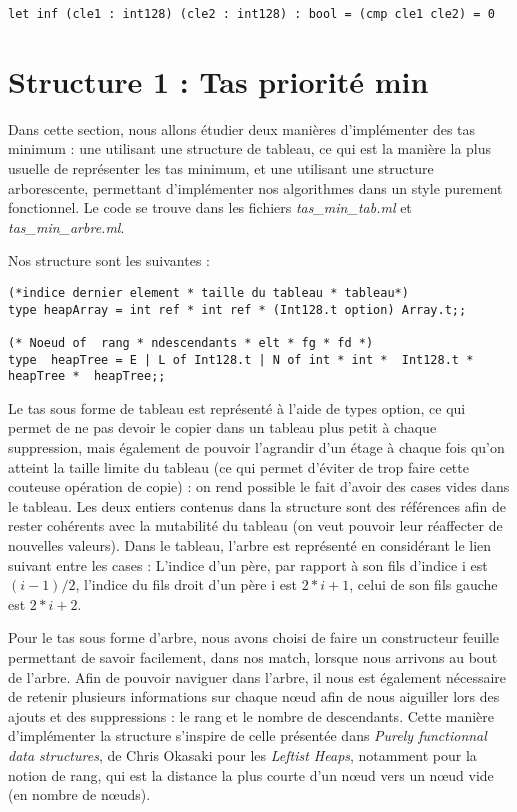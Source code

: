 \documentclass[12pt,a4paper]{article}
\begin{document}
\medskip \begin{lstlisting}
let inf (cle1 : int128) (cle2 : int128) : bool = (cmp cle1 cle2) = 0
\end{lstlisting} \medskip



 \section{Structure 1 : Tas priorité min}

Dans cette section, nous allons étudier deux manières d'implémenter des tas minimum : une utilisant une structure de tableau, ce qui est la manière la plus usuelle de représenter les tas minimum, et une utilisant une structure arborescente, permettant d'implémenter nos algorithmes dans un style purement fonctionnel.
Le code se trouve dans les fichiers \textit{tas\_min\_tab.ml} et \textit{tas\_min\_arbre.ml}. 

Nos structure sont les suivantes : 

\bigskip \begin{lstlisting}
(*indice dernier element * taille du tableau * tableau*)
type heapArray = int ref * int ref * (Int128.t option) Array.t;;

(* Noeud of  rang * ndescendants * elt * fg * fd *)
type  heapTree = E | L of Int128.t | N of int * int *  Int128.t *  heapTree *  heapTree;;
\end{lstlisting} \bigskip

Le tas sous forme de tableau est représenté à l'aide de types option, ce qui permet de ne pas devoir le copier dans un tableau plus petit à chaque suppression, mais également de pouvoir l'agrandir d'un étage à chaque fois qu'on atteint la taille limite du tableau (ce qui permet d'éviter de trop faire cette couteuse opération de copie) : on rend possible le fait d'avoir des cases vides dans le tableau. Les deux entiers contenus dans la structure sont des références afin de rester cohérents avec la mutabilité du tableau (on veut pouvoir leur réaffecter de nouvelles valeurs). Dans le tableau, l'arbre est représenté en considérant le lien suivant entre les cases : L'indice d'un père, par rapport à son fils d'indice i est $(i-1)/2$, l'indice du fils droit d'un père i est $2*i +1$, celui de son fils gauche est $2*i+2$.


Pour le tas sous forme d'arbre, nous avons choisi de faire un constructeur feuille permettant de savoir facilement, dans nos match, lorsque nous arrivons au bout de l'arbre. Afin de pouvoir naviguer dans l'arbre, il nous est également nécessaire de retenir plusieurs informations sur chaque nœud afin de nous aiguiller lors des ajouts et des suppressions : le rang et le nombre de descendants. Cette manière d'implémenter la structure s'inspire de celle présentée dans \textit{Purely functionnal data structures}, de Chris Okasaki \cite{DataStructure} pour les \textit{Leftist Heaps}, notamment pour la notion de rang, qui est la distance la plus courte d'un nœud vers un nœud vide (en nombre de nœuds). 
\end{document}
